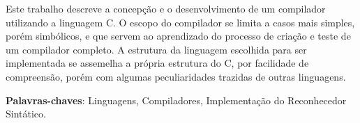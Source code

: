 Este trabalho descreve a concepção e o desenvolvimento de um compilador utilizando a linguagem C. O escopo do compilador se limita a casos mais simples, porém simbólicos, e que servem ao aprendizado do processo de criação e teste de um compilador completo. A estrutura da linguagem escolhida para ser implementada se assemelha a própria estrutura do C, por facilidade de compreensão, porém com algumas peculiaridades trazidas de outras linguagens.

\vspace{\onelineskip}
    
\noindent
\textbf{Palavras-chaves}: Linguagens, Compiladores, Implementação do Reconhecedor Sintático.
